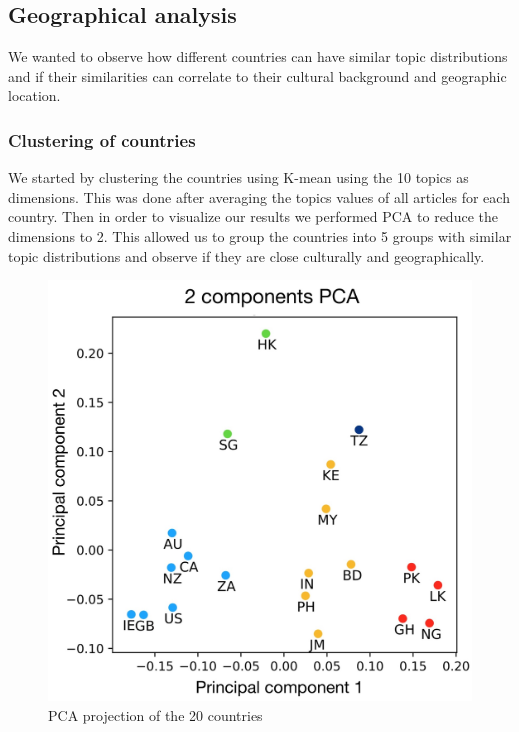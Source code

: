 \documentclass[11pt]{article}
\begin{document}
\subsection{Geographical analysis}

We wanted to observe how different countries can have similar topic distributions and if their similarities can correlate to their cultural background and geographic location. 

\subsubsection{Clustering of countries}

We started by clustering the countries using K-mean using the 10 topics as dimensions. This was done after averaging the topics values of all articles for each country. Then in order to visualize our results we performed PCA to reduce the dimensions to 2. 
This allowed us to group the countries into 5 groups with similar topic distributions and observe if they are close culturally and geographically.

\begin{figure}[hbtp!]
    \centering
    \includegraphics[width=.9\linewidth]{images/pca.jpg}
    \caption{PCA projection of the 20 countries}
    \label{fig:pca}
\end{figure}
\end{document}
